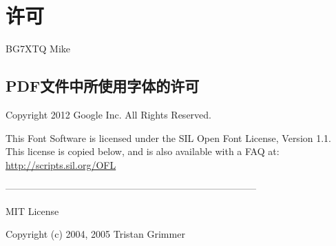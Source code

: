 \chapter*{许可}

\noindent {} BG7XTQ Mike

\section*{PDF文件中所使用字体的许可}

\noindent Copyright 2012 Google Inc. All Rights Reserved.

\noindent This Font Software is licensed under the SIL Open Font License, Version 1.1.
This license is copied below, and is also available with a FAQ at:
\url{http://scripts.sil.org/OFL}

\noindent ------------------------------------------------------------------------------

\noindent MIT License

\noindent Copyright (c) 2004, 2005 Tristan Grimmer